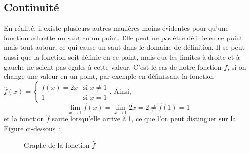 \subsection{Continuité}
En réalité, il existe plusieurs autres manières moins évidentes pour qu'une fonction admette un saut en un point. Elle peut ne pas être définie en ce point mais tout autour, ce qui cause un saut dans le domaine de définition. Il se peut aussi que la fonction soit définie en ce point, mais que les limites à droite et à gauche ne soient pas égales à cette valeur. C'est le cas de notre fonction $f$, si on change une valeur en un point, par exemple en définissant la fonction $\hat{f}(x) = \begin{cases} f(x) = 2x & \textrm{si } x \neq 1 \\ 1 & \textrm{si } x = 1 \end{cases}$.
Ainsi, 
\begin{equation}
\lim_{x \to 1} \hat{f}(x) = \lim_{x \to 1} 2x = 2 \neq \hat{f}(1) = 1
\end{equation}
et la fonction $\hat{f}$ saute lorsqu'elle arrive à 1, ce que l'on peut distinguer sur la Figure ci-dessous~:
\begin{figure}[H]
    \centering
    \caption{Graphe de la fonction $\hat{f}$}
    \label{fig:function_jump}
\end{figure}

